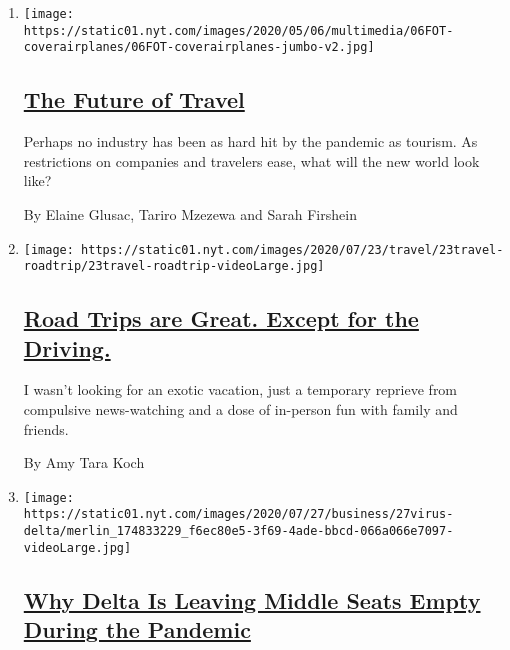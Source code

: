 \begin{enumerate}
\def\labelenumi{\arabic{enumi}.}
\item
  \texttt{[image: https://static01.nyt.com/images/2020/05/06/multimedia/06FOT-coverairplanes/06FOT-coverairplanes-jumbo-v2.jpg]}

  \hypertarget{the-future-of-travel}{%
  \subsection{\texorpdfstring{\href{/interactive/2020/05/06/travel/coronavirus-travel-questions.html}{The
  Future of Travel}}{The Future of Travel}}\label{the-future-of-travel}}

  Perhaps no industry has been as hard hit by the pandemic as tourism.
  As restrictions on companies and travelers ease, what will the new
  world look like?

  By Elaine Glusac, Tariro Mzezewa and Sarah Firshein
\item
  \texttt{[image: https://static01.nyt.com/images/2020/07/23/travel/23travel-roadtrip/23travel-roadtrip-videoLarge.jpg]}

  \hypertarget{road-trips-are-great-except-for-the-driving}{%
  \subsection{\texorpdfstring{\href{/2020/07/24/travel/virus-road-trip.html}{Road
  Trips are Great. Except for the
  Driving.}}{Road Trips are Great. Except for the Driving.}}\label{road-trips-are-great-except-for-the-driving}}

  I wasn't looking for an exotic vacation, just a temporary reprieve
  from compulsive news-watching and a dose of in-person fun with family
  and friends.

  By Amy Tara Koch
\item
  \texttt{[image: https://static01.nyt.com/images/2020/07/27/business/27virus-delta/merlin\_174833229\_f6ec80e5-3f69-4ade-bbcd-066a066e7097-videoLarge.jpg]}

  \hypertarget{why-delta-is-leaving-middle-seats-empty-during-the-pandemic}{%
  \subsection{\texorpdfstring{\href{/2020/07/27/business/delta-airlines-bill-lentsch.html}{Why
  Delta Is Leaving Middle Seats Empty During the
  Pandemic}}{Why Delta Is Leaving Middle Seats Empty During the Pandemic}}\label{why-delta-is-leaving-middle-seats-empty-during-the-pandemic}}


\end{enumerate}
